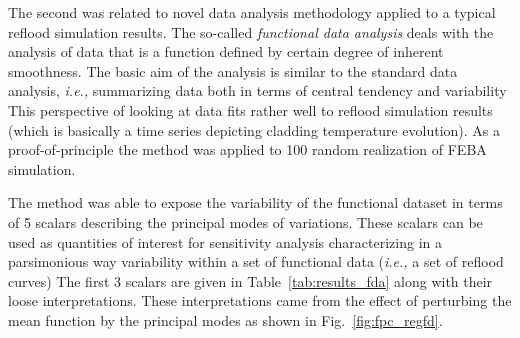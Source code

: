\documentclass[11pt,titlepage]{article}
\begin{document}
The second was related to novel data analysis methodology applied to a 
typical reflood simulation results.
The so-called \textit{functional data analysis} deals with the 
analysis of data that is a function defined by certain degree of inherent 
smoothness. 
The basic aim of the analysis is similar to the standard data analysis, 
\textit{i.e.,} summarizing data both in terms of central tendency and 
variability 
This perspective of looking at data fits rather well to reflood simulation 
results (which is basically a time series depicting cladding temperature 
evolution).
As a proof-of-principle the method was applied to 100 random realization 
of FEBA simulation.

The method was able to expose the variability of the functional dataset 
in terms of 5 scalars describing the principal modes of variations.
These scalars can be used as quantities of interest for sensitivity 
analysis characterizing in a parsimonious way variability within a 
set of functional data (\textit{i.e.,} a set of reflood curves)
The first 3 scalars are given in Table~\ref{tab:results_fda} along 
with their loose interpretations. 
These interpretations came from the effect of perturbing the mean function 
by the principal modes as shown in Fig.~\ref{fig:fpc_regfd}.
    
\end{document}
